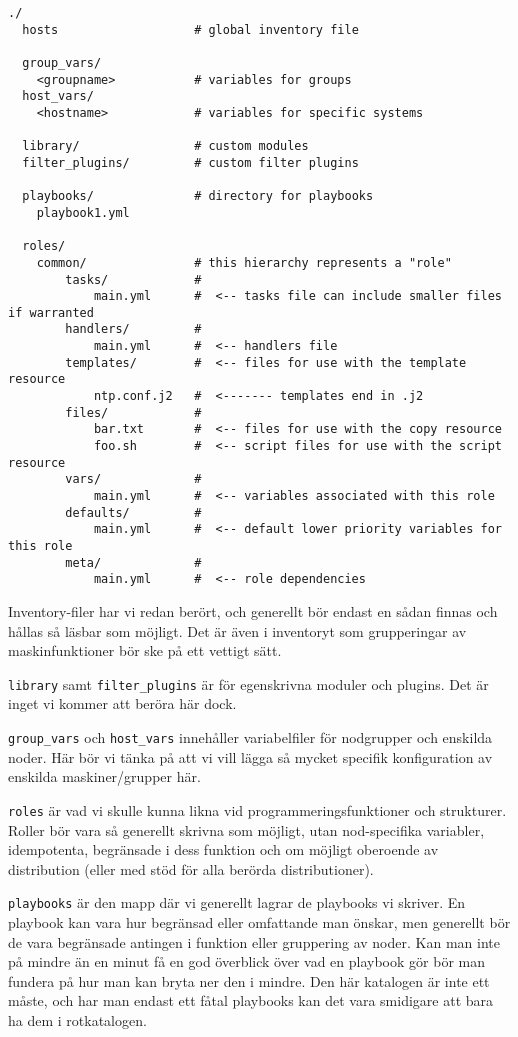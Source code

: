 \begin{verbatim}
./
  hosts                   # global inventory file
  
  group_vars/
    <groupname>           # variables for groups
  host_vars/
    <hostname>            # variables for specific systems
  
  library/                # custom modules
  filter_plugins/         # custom filter plugins
  
  playbooks/              # directory for playbooks
    playbook1.yml

  roles/                  
    common/               # this hierarchy represents a "role"
        tasks/            #
            main.yml      #  <-- tasks file can include smaller files if warranted
        handlers/         #
            main.yml      #  <-- handlers file
        templates/        #  <-- files for use with the template resource
            ntp.conf.j2   #  <------- templates end in .j2
        files/            #
            bar.txt       #  <-- files for use with the copy resource
            foo.sh        #  <-- script files for use with the script resource
        vars/             #
            main.yml      #  <-- variables associated with this role
        defaults/         #
            main.yml      #  <-- default lower priority variables for this role
        meta/             #
            main.yml      #  <-- role dependencies

\end{verbatim}

Inventory-filer har vi redan berört, och generellt bör endast en sådan finnas och hållas så läsbar som möjligt.
Det är även i inventoryt som grupperingar av maskinfunktioner bör ske på ett vettigt sätt.

\texttt{library} samt \texttt{filter\_plugins} är för egenskrivna moduler och plugins. 
Det är inget vi kommer att beröra här dock.

\texttt{group\_vars} och \texttt{host\_vars} innehåller variabelfiler för nodgrupper och enskilda noder.
Här bör vi tänka på att vi vill lägga så mycket specifik konfiguration av enskilda maskiner/grupper här. 

\texttt{roles} är vad vi skulle kunna likna vid programmeringsfunktioner och strukturer. Roller bör vara så
generellt skrivna som möjligt, utan nod-specifika variabler, idempotenta, begränsade i dess funktion och 
om möjligt oberoende av distribution (eller med stöd för alla berörda distributioner).

\texttt{playbooks} är den mapp där vi generellt lagrar de playbooks vi skriver. En playbook kan vara hur begränsad
eller omfattande man önskar, men generellt bör de vara begränsade antingen i funktion eller gruppering av noder.
Kan man inte på mindre än en minut få en god överblick över vad en playbook gör bör man fundera på hur man kan
bryta ner den i mindre. Den här katalogen är inte ett måste, och har man endast ett fåtal playbooks kan det 
vara smidigare att bara ha dem i rotkatalogen.

